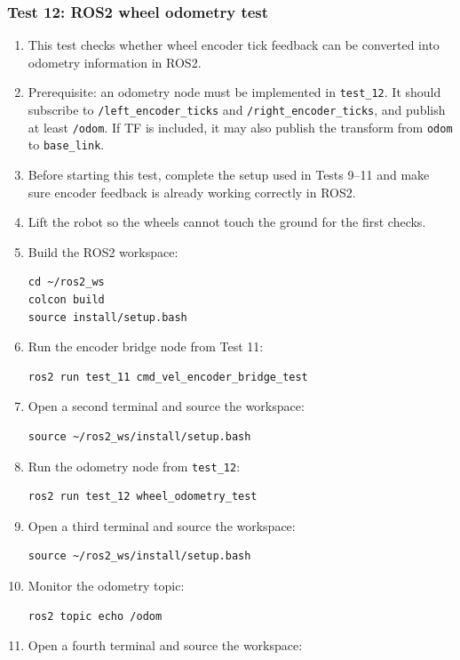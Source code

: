 \documentclass[12pt]{article}
\begin{document}
\subsubsection{Test 12: ROS2 wheel odometry test}
\begin{enumerate}
    \item This test checks whether wheel encoder tick feedback can be converted into odometry information in ROS2.
    \item Prerequisite: an odometry node must be implemented in \texttt{test\_12}. It should subscribe to \texttt{/left\_encoder\_ticks} and \texttt{/right\_encoder\_ticks}, and publish at least \texttt{/odom}. If TF is included, it may also publish the transform from \texttt{odom} to \texttt{base\_link}.
    \item Before starting this test, complete the setup used in Tests 9--11 and make sure encoder feedback is already working correctly in ROS2.
    \item Lift the robot so the wheels cannot touch the ground for the first checks.
    \item Build the ROS2 workspace:
    \begin{verbatim}
cd ~/ros2_ws
colcon build
source install/setup.bash
    \end{verbatim}
    \item Run the encoder bridge node from Test 11:
    \begin{verbatim}
ros2 run test_11 cmd_vel_encoder_bridge_test
    \end{verbatim}
    \item Open a second terminal and source the workspace:
    \begin{verbatim}
source ~/ros2_ws/install/setup.bash
    \end{verbatim}
    \item Run the odometry node from \texttt{test\_12}:
    \begin{verbatim}
ros2 run test_12 wheel_odometry_test
    \end{verbatim}
    \item Open a third terminal and source the workspace:
    \begin{verbatim}
source ~/ros2_ws/install/setup.bash
    \end{verbatim}
    \item Monitor the odometry topic:
    \begin{verbatim}
ros2 topic echo /odom
    \end{verbatim}
    \item Open a fourth terminal and source the workspace:

\end{enumerate}
\end{document}

